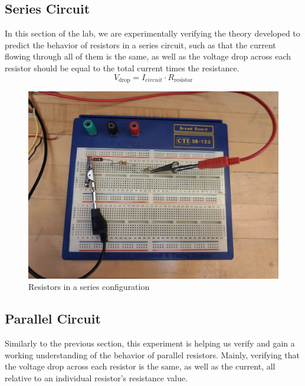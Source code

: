 \documentclass[titlepage]{article}
\begin{document}
        \subsection{Series Circuit}

        In this section of the lab, we are experimentally verifying the theory developed to predict the behavior of resistors in a series circuit, such as that the current flowing through all of them is the same, as well as the voltage drop across each resistor should be equal to the total current times the resistance.
        $$V_\text{drop}=I_{circuit} \cdot R_\text{resistor}$$

        \begin{figure}[hbt!]
            \centering
            \caption{Resistors in a series configuration}
    \includegraphics[scale=0.2]{procedure/series} 
        \end{figure}



        \FloatBarrier
        \subsection{Parallel Circuit}
        Similarly to the previous section, this experiment is helping us verify and gain a working understanding of the behavior of parallel resistors. Mainly, verifying that the voltage drop across each resistor is the same, as well as the current, all relative to an individual resistor's resistance value. 
\end{document}
